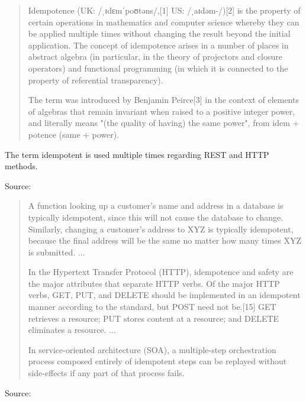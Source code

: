 \documentclass[Screen16to9,17pt]{foils}
\begin{document}

\begin{quote}
Idempotence (UK: /ˌɪdɛmˈpoʊtəns/,[1] US: /ˌaɪdəm-/)[2] is the property of certain operations in mathematics and computer science whereby they can be applied multiple times without changing the result beyond the initial application. The concept of idempotence arises in a number of places in abstract algebra (in particular, in the theory of projectors and closure operators) and functional programming (in which it is connected to the property of referential transparency).

The term was introduced by Benjamin Peirce[3] in the context of elements of algebras that remain invariant when raised to a positive integer power, and literally means "(the quality of having) the same power", from idem + potence (same + power).
\end{quote}

\begin{list2}
\item The term idempotent is used multiple times regarding REST and HTTP methods.
\end{list2}

Source: {\footnotesize\\
}


\begin{quote}
A function looking up a customer's name and address in a database is typically idempotent, since this will not cause the database to change. Similarly, changing a customer's address to XYZ is typically idempotent, because the final address will be the same no matter how many times XYZ is submitted.
...

In the Hypertext Transfer Protocol (HTTP), idempotence and safety are the major attributes that separate HTTP verbs. Of the major HTTP verbs, GET, PUT, and DELETE should be implemented in an idempotent manner according to the standard, but POST need not be.[15] GET retrieves a resource; PUT stores content at a resource; and DELETE eliminates a resource.
...

In service-oriented architecture (SOA), a multiple-step orchestration process composed entirely of idempotent steps can be replayed without side-effects if any part of that process fails.
\end{quote}


Source: {\footnotesize\\
}
\end{document}
